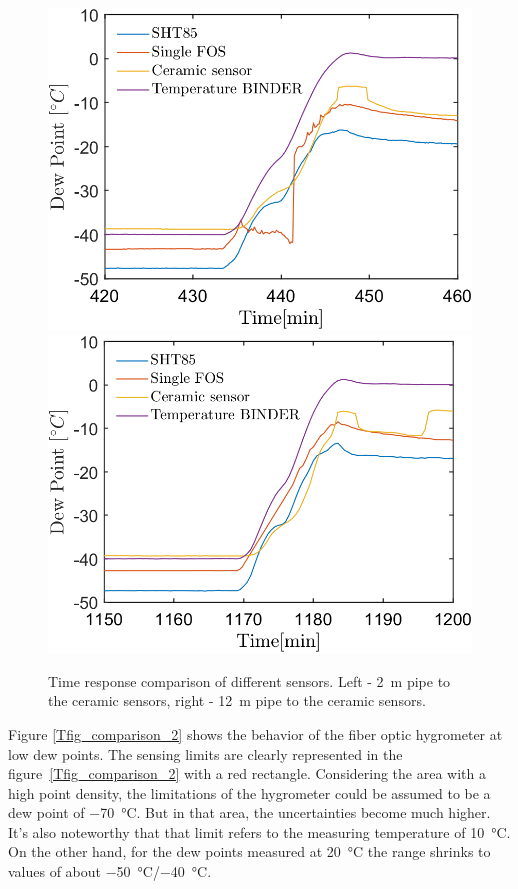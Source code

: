 \begin{figure}[!h]
\centering
\includegraphics[width=0.47\columnwidth]{Chapter5/images/DPCPercent_response2m.png}
\includegraphics[width=0.47\columnwidth]{Chapter5/images/DPCPercent_response12m.png}
\caption{Time response comparison of different sensors. Left - \SI{2}{\metre} pipe to the ceramic sensors, right - \SI{12}{\metre} pipe to the ceramic sensors.}
\label{fig_comparison}
\end{figure}
\newpage
Figure \ref{Tfig_comparison_2} shows the behavior of the fiber optic hygrometer at low dew points. The sensing limits are clearly represented in the figure~\ref{Tfig_comparison_2} with a red rectangle. Considering the area with a high point density, the limitations of the hygrometer could be assumed to be a dew point of \SI{-70}{\celsius}. But in that area, the uncertainties become much higher. It's also noteworthy that that limit refers to the measuring temperature of \SI{10}{\celsius}. On the other hand, for the dew points measured at \SI{20}{\celsius} the range shrinks to values of about \SI{-50}{\celsius}/\SI{-40}{\celsius}.

